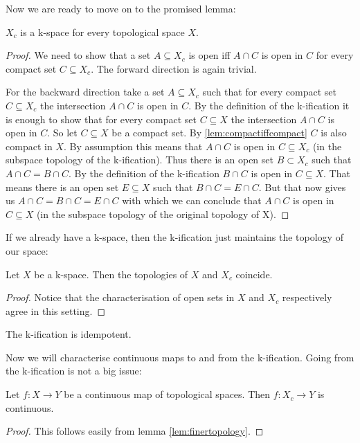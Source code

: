Now we are ready to move on to the promised lemma:

\begin{lem}\label{lem:kificationiskspace}
    $X_c$ is a k-space for every topological space $X$.
\end{lem}
\begin{proof}
    We need to show that a set $A \subseteq X_c$ is open iff $A \cap C$ is open in $C$ for every compact set $C \subseteq X_c$. The forward direction is again trivial. 
    
    For the backward direction take a set $A \subseteq X_c$ such that for every compact set $C \subseteq X_c$ the intersection $A \cap C$ is open in $C$. 
    By the definition of the k-ification it is enough to show that for every compact set $C \subseteq X$ the intersection $A \cap C$ is open in $C$. So let $C \subseteq X$ be a compact set. 
    By \ref{lem:compactiffcompact} $C$ is also compact in $X$.
    By assumption this means that $A \cap C$ is open in $C \subseteq X_c$ (in the subspace topology of the k-ification). Thus there is an open set $B \subset X_c$ such that $A \cap C = B \cap C$. 
    By the definition of the k-ification $B \cap C$ is open in $C \subseteq X$. 
    That means there is an open set $E \subseteq X$ such that $B \cap C = E \cap C$. 
    But that now gives us $A \cap C = B \cap C = E \cap C$ with which we can conclude that $A \cap C$ is open in $C \subseteq X$ (in the subspace topology of the original topology of X).
\end{proof}

If we already have a k-space, then the k-ification just maintains the topology of our space:

\begin{lem}\label{lem:kificationkspace}
    Let $X$ be a k-space.
    Then the topologies of $X$ and $X_c$ coincide.
\end{lem}
\begin{proof}
    Notice that the characterisation of open sets in $X$ and $X_c$ respectively agree in this setting.
\end{proof}

\begin{cor}
    The k-ification is idempotent.
\end{cor}

Now we will characterise continuous maps to and from the k-ification. 
Going from the k-ification is not a big issue: 

\begin{lem}\label{lem:continuousfromkification}
    Let $f \colon X \to Y$ be a continuous map of topological spaces.
    Then $f \colon X_c \to Y$ is continuous.
\end{lem}
\begin{proof}
    This follows easily from lemma \ref{lem:finertopology}.
\end{proof}

